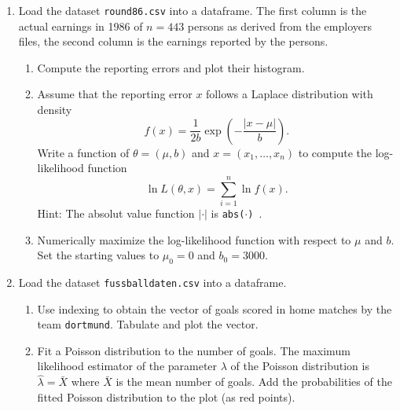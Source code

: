 \documentclass{article}
\begin{document}
\begin{enumerate}
\item Load the dataset \texttt{round86.csv} into a dataframe. The first
column is the actual earnings in 1986 of $n=443$ persons as derived from the
employers files, the second column is the earnings reported by the persons.

\begin{enumerate}
\item Compute the reporting errors and plot their histogram.

\item Assume that the reporting error $x$ follows a Laplace distribution
with density%
\begin{equation*}
f\left( x\right) =\frac{1}{2b}\exp \left( -\frac{|x-\mu |}{b}\right) .
\end{equation*}%
Write a function of $\theta =(\mu ,b)$ and $x=(x_{1},\ldots ,x_{n})$ to
compute the log-likelihood function%
\begin{equation*}
\ln L\left( \theta ,x\right) =\sum_{i=1}^{n}\ln f\left( x\right) .
\end{equation*}%
Hint: The absolut value function $|\cdot |$ is \texttt{abs(}$\cdot $\texttt{)%
}.

\item Numerically maximize the log-likelihood function with respect to $\mu $
and $b$. Set the starting values to $\mu _{0}=0$ and $b_{0}=3000$.
\end{enumerate}

\item Load the dataset \texttt{fussballdaten.csv} into a dataframe.

\begin{enumerate}
\item Use indexing to obtain the vector of goals scored in home matches by
the team \texttt{dortmund}. Tabulate and plot the vector.

\item Fit a Poisson distribution to the number of goals. The maximum
likelihood estimator of the parameter $\lambda $ of the Poisson distribution
is $\hat{\lambda}=\bar{X}$ where $\bar{X}$ is the mean number of goals. Add
the probabilities of the fitted Poisson distribution to the plot (as red
points).

\end{enumerate}


\end{enumerate}
\end{document}
